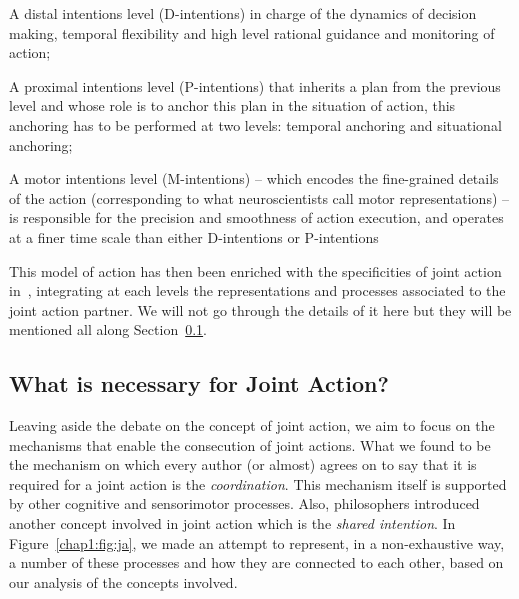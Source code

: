 \documentclass[a4paper,11pt,twoside]{StyleThese}
\begin{document}
\begin{bulletList}
	\item A distal intentions level (D-intentions) in charge of the dynamics of decision making, temporal flexibility and high level rational guidance and monitoring of action;
	\item A proximal intentions level (P-intentions) that inherits a plan from the previous level and whose role is to anchor this plan in the situation of action, this anchoring has to be performed at two levels: temporal anchoring and situational anchoring;
	\item A motor intentions level (M-intentions) -- which encodes the fine-grained details of the action (corresponding to what neuroscientists call motor representations) -- is responsible for the precision and smoothness of action execution, and operates at a finer time scale than either D-intentions or P-intentions
\end{bulletList}

This model of action has then been enriched with the specificities of joint action in~\cite{pacherie_2012_agency}, integrating at each levels the representations and processes associated to the joint action partner. We will not go through the details of it here but they will be mentioned all along Section~\ref{chap1:subsec:necess_ja}.

\subsection{What is necessary for Joint Action?}\label{chap1:subsec:necess_ja}

Leaving aside the debate on the concept of joint action, we aim to focus on the mechanisms that enable the consecution of joint actions. What we found to be the mechanism on which every author (or almost) agrees on to say that it is required for a joint action is the \emph{coordination}. This mechanism itself is supported by other cognitive and sensorimotor processes. Also, philosophers introduced another concept involved in joint action which is the \emph{shared intention}. In Figure~\ref{chap1:fig:ja}, we made an attempt to represent, in a non-exhaustive way, a number of these processes and how they are connected to each other, based on our analysis of the concepts involved.
\end{document}
